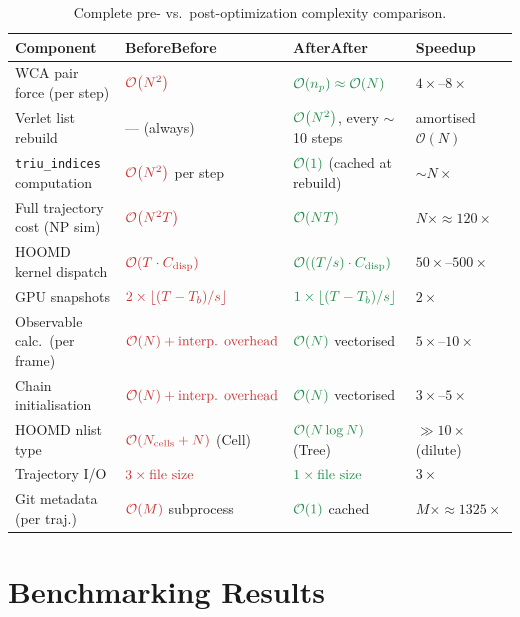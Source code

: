 \documentclass[12pt,a4paper]{article}
\newcommand{\Obig}[1]{\mathcal{O}\!\left(#1\right)}
\newcommand{\good}[1]{\ifmmode\textcolor{newgreen}{#1}\else\textcolor{newgreen}{\textbf{#1}}\fi}
\newcommand{\bad}[1]{\ifmmode\textcolor{oldred}{#1}\else\textcolor{oldred}{\textbf{#1}}\fi}
\newcommand{\code}[1]{\texttt{#1}}
\begin{document}
\begin{table}[h]
\centering
\caption{Complete pre- vs.\ post-optimization complexity comparison.}
\label{tab:full-complexity}
\begin{tabular}{p{4.5cm}lll}
\toprule
Component & \bad{Before} & \good{After} & Speedup \\
\midrule
WCA pair force (per step)
  & $\bad{\Obig{N^2}}$
  & $\good{\Obig{n_p}\approx\Obig{N}}$
  & $4\times$--$8\times$ \\
Verlet list rebuild
  & --- (always)
  & $\good{\Obig{N^2}}$, every $\sim$10 steps
  & amortised $\Obig{N}$ \\
\code{triu\_indices} computation
  & $\bad{\Obig{N^2}}$ per step
  & $\good{\Obig{1}}$ (cached at rebuild)
  & $\sim N\times$ \\
Full trajectory cost (NP sim)
  & $\bad{\Obig{N^2 T}}$
  & $\good{\Obig{N T}}$
  & $N\times\approx 120\times$ \\
HOOMD kernel dispatch
  & $\bad{\Obig{T \cdot C_\text{disp}}}$
  & $\good{\Obig{(T/s) \cdot C_\text{disp}}}$
  & $50\times$--$500\times$ \\
GPU snapshots
  & $\bad{2 \times \lfloor(T-T_b)/s\rfloor}$
  & $\good{1 \times \lfloor(T-T_b)/s\rfloor}$
  & $2\times$ \\
Observable calc.\ (per frame)
  & $\bad{\Obig{N} + \text{interp. overhead}}$
  & $\good{\Obig{N}}$ vectorised
  & $5\times$--$10\times$ \\
Chain initialisation
  & $\bad{\Obig{N} + \text{interp. overhead}}$
  & $\good{\Obig{N}}$ vectorised
  & $3\times$--$5\times$ \\
HOOMD nlist type
  & $\bad{\Obig{N_\text{cells}+N}}$ (Cell)
  & $\good{\Obig{N\log N}}$ (Tree)
  & $\gg 10\times$ (dilute) \\
Trajectory I/O
  & $\bad{3\times \text{file size}}$
  & $\good{1\times \text{file size}}$
  & $3\times$ \\
Git metadata (per traj.)
  & $\bad{\Obig{M}}$ subprocess
  & $\good{\Obig{1}}$ cached
  & $M\times \approx 1325\times$ \\
\bottomrule
\end{tabular}
\end{table}

\section{Benchmarking Results}
\label{sec:bench}
\end{document}
